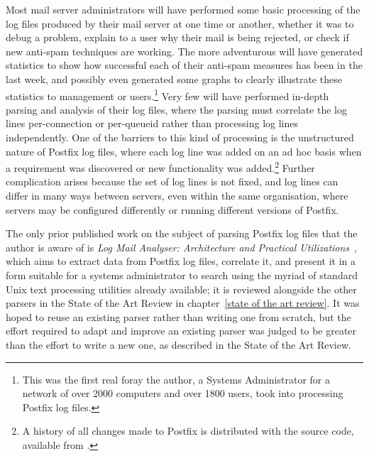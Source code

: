 Most mail server administrators will have performed some basic processing
of the log files produced by their mail server at one time or another,
whether it was to debug a problem, explain to a user why their mail is
being rejected, or check if new anti-spam techniques are working.  The more
adventurous will have generated statistics to show how successful each of
their anti-spam measures has been in the last week, and possibly even
generated some graphs to clearly illustrate these statistics to management
or users.\footnote{This was the first real foray the author, a Systems
Administrator for a network of over 2000 computers and over 1800 users,
took into processing Postfix log files.}  Very few will have performed
in-depth parsing and analysis of their log files, where the parsing must
correlate the log lines per-connection or per-queueid rather than
processing log lines independently.  One of the barriers to this kind of
processing is the unstructured nature of Postfix log files, where each log
line was added on an ad hoc basis when a requirement was discovered or new
functionality was added.\footnote{A history of all changes made to Postfix
is distributed with the source code, available from
.}  Further
complication arises because the set of log lines is not fixed, and log
lines can differ in many ways between servers, even within the same
organisation, where servers may be configured differently or running
different versions of Postfix.

The only prior published work on the subject of parsing Postfix log files
that the author is aware of is \textit{Log Mail Analyser: Architecture and
Practical Utilizations\/}~\cite{log-mail-analyser}, which aims to extract
data from Postfix log files, correlate it, and present it in a form
suitable for a systems administrator to search using the myriad of standard
Unix text processing utilities already available; it is reviewed alongside
the other parsers in the State of the Art Review in chapter~\ref{state of
the art review}.  It was hoped to reuse an existing parser rather than
writing one from scratch, but the effort required to adapt and improve an
existing parser was judged to be greater than the effort to write a new
one, as described in the State of the Art Review.

